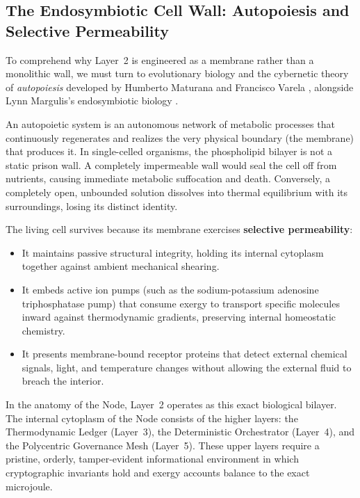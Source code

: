 \subsection{The Endosymbiotic Cell Wall: Autopoiesis and Selective Permeability}

To comprehend why Layer~2 is engineered as a membrane rather than a monolithic wall, we must turn to evolutionary biology and the cybernetic theory of \textit{autopoiesis} developed by Humberto Maturana and Francisco Varela \parencite{maturana1980}, alongside Lynn Margulis's endosymbiotic biology \parencite{margulis1998}.

An autopoietic system is an autonomous network of metabolic processes that continuously regenerates and realizes the very physical boundary (the membrane) that produces it. In single-celled organisms, the phospholipid bilayer is not a static prison wall. A completely impermeable wall would seal the cell off from nutrients, causing immediate metabolic suffocation and death. Conversely, a completely open, unbounded solution dissolves into thermal equilibrium with its surroundings, losing its distinct identity.

The living cell survives because its membrane exercises \textbf{selective permeability}:
\begin{itemize}
    \item It maintains passive structural integrity, holding its internal cytoplasm together against ambient mechanical shearing.
    \item It embeds active ion pumps (such as the sodium-potassium adenosine triphosphatase pump) that consume exergy to transport specific molecules inward against thermodynamic gradients, preserving internal homeostatic chemistry.
    \item It presents membrane-bound receptor proteins that detect external chemical signals, light, and temperature changes without allowing the external fluid to breach the interior.
\end{itemize}

In the anatomy of the Node, Layer~2 operates as this exact biological bilayer. The internal cytoplasm of the Node consists of the higher layers: the Thermodynamic Ledger (Layer~3), the Deterministic Orchestrator (Layer~4), and the Polycentric Governance Mesh (Layer~5). These upper layers require a pristine, orderly, tamper-evident informational environment in which cryptographic invariants hold and exergy accounts balance to the exact microjoule.

